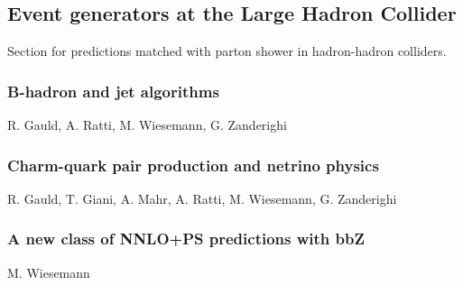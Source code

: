 \documentclass{FBR_Bericht_2025}
\begin{document}
\subsection[Event generators at the LHC]{Event generators at the Large Hadron Collider}
\begin{refsection}
Section for predictions matched with parton shower in hadron-hadron colliders.
%
\subsubsection{B-hadron and jet algorithms}
\begin{Namen}
R. Gauld, A. Ratti, M. Wiesemann, G. Zanderighi
\end{Namen}
%
\subsubsection{Charm-quark pair production and netrino physics}
\begin{Namen}
R. Gauld, T. Giani, A. Mahr, A. Ratti, M. Wiesemann, G. Zanderighi
\end{Namen}
%
\subsubsection{A new class of NNLO+PS predictions with bbZ}
\begin{Namen}
M. Wiesemann
\end{Namen}
%

\end{refsection}
\end{document}
